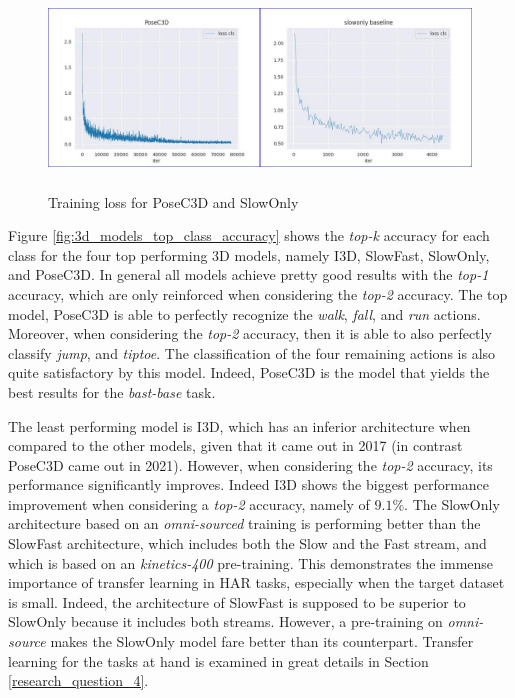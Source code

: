 \documentclass[extern,palatino]{cgMA}
\begin{document}
\begin{figure}[h]
\center
\includegraphics[height={150pt}, width={430pt}]{Thesis/images/3D_models_base_loss.jpg}
\caption{Training loss for PoseC3D and SlowOnly}
\label{fig:3d_models_base_loss}
\end{figure}

\bigskip
\noindent Figure \ref{fig:3d_models_top_class_accuracy} shows the \textit{top-k} accuracy for each class for the four top performing 3D models, namely I3D, SlowFast, SlowOnly, and PoseC3D. In general all models achieve pretty good results with the \textit{top-1} accuracy, which are only reinforced when considering the \textit{top-2} accuracy. The top model, PoseC3D is able to perfectly recognize the \textit{walk}, \textit{fall}, and \textit{run} actions. Moreover, when considering the \textit{top-2} accuracy, then it is able to also perfectly classify \textit{jump}, and \textit{tiptoe}. The classification of the four remaining actions is also quite satisfactory by this model. Indeed, PoseC3D is the model that yields the best results for the \textit{bast-base} task.

\bigskip
\noindent The least performing model is I3D, which has an inferior architecture when compared to the other models, given that it came out in 2017 (in contrast PoseC3D came out in 2021). However, when considering the \textit{top-2} accuracy, its performance significantly improves. Indeed I3D shows the biggest performance improvement when considering a \textit{top-2} accuracy, namely of $9.1\%$. The SlowOnly architecture based on an \textit{omni-sourced} training is performing better than the SlowFast architecture, which includes both the Slow and the Fast stream, and which is based on an \textit{kinetics-400} pre-training. This demonstrates the immense importance of transfer learning in HAR tasks, especially when the target dataset is small. Indeed, the architecture of SlowFast is supposed to be superior to SlowOnly because it includes both streams. However, a pre-training on \textit{omni-source} makes the SlowOnly model fare better than its counterpart. Transfer learning for the tasks at hand is examined in great details in Section \ref{research_question_4}.
\end{document}

